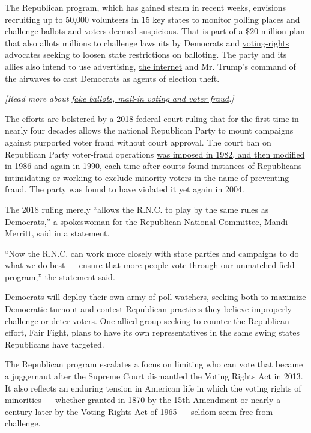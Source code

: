The Republican program, which has gained steam in recent weeks,
envisions recruiting up to 50,000 volunteers in 15 key states to monitor
polling places and challenge ballots and voters deemed suspicious. That
is part of a \$20 million plan that also allots millions to challenge
lawsuits by Democrats and
\href{https://www.nytimes3xbfgragh.onion/2020/07/18/us/supreme-court-voting-rights.html}{voting-rights}
advocates seeking to loosen state restrictions on balloting. The party
and its allies also intend to use advertising,
\href{https://protectthevote.com/?utm_medium=email\&utm_source=pu_48\&utm_campaign=20200508_123842_\&utm_content=\&_ga=2.58845101.124784289.1588967538-1349174632.1588967538}{the
internet} and Mr. Trump's command of the airwaves to cast Democrats as
agents of election theft.

\emph{{[}Read more about}
\href{https://www.nytimes3xbfgragh.onion/article/mail-in-vote-fraud-ballot.html}{\emph{fake
ballots, mail-in voting and voter fraud}}\emph{.{]}}

The efforts are bolstered by a 2018 federal court ruling that for the
first time in nearly four decades allows the national Republican Party
to mount campaigns against purported voter fraud without court approval.
The court ban on Republican Party voter-fraud operations
\href{https://www.theatlantic.com/politics/archive/2018/01/the-gop-just-received-another-tool-for-suppressing-votes/550052/}{was
imposed in 1982, and then modified in 1986 and again in 1990,} each time
after courts found instances of Republicans intimidating or working to
exclude minority voters in the name of preventing fraud. The party was
found to have violated it yet again in 2004.

The 2018 ruling merely ``allows the R.N.C. to play by the same rules as
Democrats,'' a spokeswoman for the Republican National Committee, Mandi
Merritt, said in a statement.

``Now the R.N.C. can work more closely with state parties and campaigns
to do what we do best --- ensure that more people vote through our
unmatched field program,'' the statement said.

Democrats will deploy their own army of poll watchers, seeking both to
maximize Democratic turnout and contest Republican practices they
believe improperly challenge or deter voters. One allied group seeking
to counter the Republican effort, Fair Fight, plans to have its own
representatives in the same swing states Republicans have targeted.

The Republican program escalates a focus on limiting who can vote that
became a juggernaut after the Supreme Court dismantled the Voting Rights
Act in 2013. It also reflects an enduring tension in American life in
which the voting rights of minorities --- whether granted in 1870 by the
15th Amendment or nearly a century later by the Voting Rights Act of
1965 --- seldom seem free from challenge.

